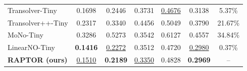 \documentclass[a4paper,fleqn]{cas-sc}
\begin{document}
\begin{center}
\begin{minipage}{1.00\linewidth}
\begin{tabular}{@{}lccccc@{\hspace{8pt}}c@{}}
        Transolver-Tiny 
        & 0.1698
        & 0.2446
        & 0.3731
        & \underline{0.4676}
        & 0.3138
        & 5.37\% \\
        
        Transolver++-Tiny
        & 0.2317
        & 0.3340
        & 0.4456
        & 0.5049
        & 0.3790
        & 21.67\% \\
        
        MoNo-Tiny
        & 0.3286
        & 0.5273
        & 0.3542
        & 0.6127
        & 0.4557
        & 34.84\% \\
        
        LinearNO-Tiny
        & \textbf{0.1416}
        & \underline{0.2272}
        & 0.3512
        & 0.4720
        & \underline{0.2980}
        & 0.37\% \\
        
        \midrule
        
        \textbf{RAPTOR (ours)}
        & \underline{0.1510}
        & \textbf{0.2189}
        & \underline{0.3350}
        & 0.4828
        & \textbf{0.2969}
        & -- \\
        \bottomrule
    \end{tabular}
       \end{minipage}
\end{center}
\end{document}
